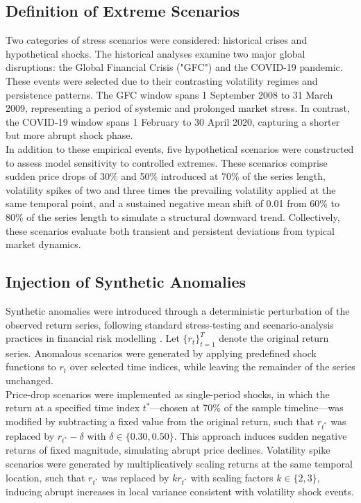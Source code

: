 \documentclass[oneside,12pt]{CUEDthesisPSnPDF}
\newcommand{\parencite}{\citep}
\begin{document}
\subsection{Definition of Extreme Scenarios}
\noindent
Two categories of stress scenarios were considered: historical crises and hypothetical shocks.
The historical analyses examine two major global disruptions: the Global Financial Crisis ("GFC") and the COVID-19 pandemic. These events were selected due to their contrasting volatility regimes and persistence patterns. The GFC window spans 1 September 2008 to 31 March 2009, representing a period of systemic and prolonged market stress. In contrast, the COVID-19 window spans 1 February to 30 April 2020, capturing a shorter but more abrupt shock phase.\\

In addition to these empirical events, five hypothetical scenarios were constructed to assess model sensitivity to controlled extremes. These scenarios comprise sudden price drops of 30\% and 50\% introduced at 70\% of the series length, volatility spikes of two and three times the prevailing volatility applied at the same temporal point, and a sustained negative mean shift of 0.01 from 60\% to 80\% of the series length to simulate a structural downward trend. Collectively, these scenarios evaluate both transient and persistent deviations from typical market dynamics.\\

\subsection{Injection of Synthetic Anomalies}
\noindent

Synthetic anomalies were introduced through a deterministic perturbation of the observed return series, following standard stress-testing and scenario-analysis practices in financial risk modelling \parencite{engle1993measuring}. Let $\{r_t\}_{t=1}^T$ denote the original return series. Anomalous scenarios were generated by applying predefined shock functions to $r_t$ over selected time indices, while leaving the remainder of the series unchanged.\\

Price-drop scenarios were implemented as single-period shocks, in which the return at a specified time index $t^\ast$—chosen at 70\% of the sample timeline—was modified by subtracting a fixed value from the original return, such that $r_{t^\ast}$ was replaced by $r_{t^\ast} - \delta$ with $\delta \in \{0.30, 0.50\}$. This approach induces sudden negative returns of fixed magnitude, simulating abrupt price declines. Volatility spike scenarios were generated by multiplicatively scaling returns at the same temporal location, such that $r_{t^\ast}$ was replaced by $k r_{t^\ast}$ with scaling factors $k \in \{2,3\}$, inducing abrupt increases in local variance consistent with volatility shock events.\\
\end{document}

